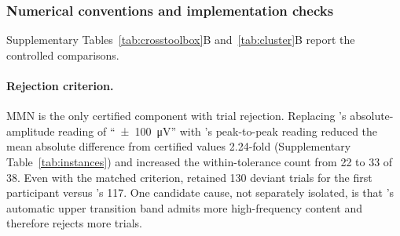 \begin{table}[!htbp]
\centering\small
\caption{Default-toolbox agreement with certified values. Bias (toolbox minus certified), paired-difference standard deviation \(s_d\), reference between-subject standard deviation \(s_b\), and the two sample-size inflation scenarios follow Methods (``Size of toolbox-induced differences''). Limits of agreement are bias \(\pm 1.96\,s_d\). Source: \texttt{tools/benchmark/reports/attenuation.json}.}
\label{tab:ba}
\end{table}
\subsubsection*{Numerical conventions and implementation checks}

Supplementary Tables~\ref*{tab:crosstoolbox}B and~\ref*{tab:cluster}B report the controlled comparisons.

\paragraph{Rejection criterion.} MMN is the only certified component with trial rejection. Replacing \eeglab{}'s absolute-amplitude reading of ``\SI{\pm 100}{\uV}'' with \mne{}'s peak-to-peak reading reduced the mean absolute difference from certified values 2.24-fold (Supplementary Table~\ref*{tab:instances}) and increased the within-tolerance count from 22 to 33 of 38. Even with the matched criterion, \eeglab{} retained 130 deviant trials for the first participant versus \mne{}'s 117. One candidate cause, not separately isolated, is that \mne{}'s automatic upper transition band admits more high-frequency content and therefore rejects more trials.

